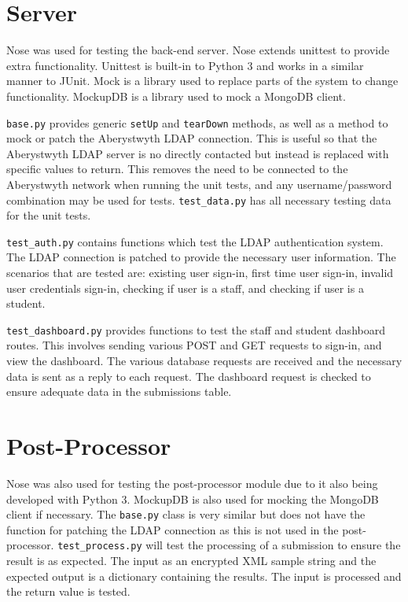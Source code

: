 \section{Server}
Nose was used for testing the back-end server. Nose extends unittest to provide extra functionality. Unittest is built-in to Python 3 and works in a similar manner to JUnit. Mock is a library used to replace parts of the system to change functionality. MockupDB is a library used to mock a MongoDB client.

\texttt{base.py} provides generic \texttt{setUp} and \texttt{tearDown} methods, as well as a method to mock or patch the Aberystwyth LDAP connection. This is useful so that the Aberystwyth LDAP server is no directly contacted but instead is replaced with specific values to return. This removes the need to be connected to the Aberystwyth network when running the unit tests, and any username/password combination may be used for tests. \texttt{test\_data.py} has all necessary testing data for the unit tests.

\texttt{test\_auth.py} contains functions which test the LDAP authentication system. The LDAP connection is patched to provide the necessary user information. The scenarios that are tested are: existing user sign-in, first time user sign-in, invalid user credentials sign-in, checking if user is a staff, and checking if user is a student.

\texttt{test\_dashboard.py} provides functions to test the staff and student dashboard routes. This involves sending various POST and GET requests to sign-in, and view the dashboard. The various database requests are received and the necessary data is sent as a reply to each request. The dashboard request is checked to ensure adequate data in the submissions table.

\section{Post-Processor}
Nose was also used for testing the post-processor module due to it also being developed with Python 3. MockupDB is also used for mocking the MongoDB client if necessary. The \texttt{base.py} class is very similar but does not have the function for patching the LDAP connection as this is not used in the post-processor. \texttt{test\_process.py} will test the processing of a submission to ensure the result is as expected. The input as an encrypted XML sample string and the expected output is a dictionary containing the results. The input is processed and the return value is tested.

